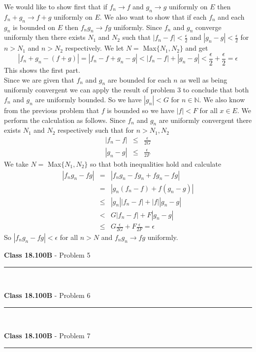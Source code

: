 \documentclass[11pt,reqno]{article}
\begin{document}
We would like to show first that if $f_n \to f$ and $g_n \to g$ uniformly on $E$ then $f_n + g_n \to f + g$ uniformly on $E$. We also want to show that if each $f_n$ and each $g_n$ is bounded on $E$ then $f_n g_n \to fg$ uniformly.
Since $f_n$ and $g_n$ converge uniformly then there exists $N_1$ and $N_2$ such that $|f_n - f | < \frac{\epsilon}{2}$ and $|g_n - g | < \frac{\epsilon}{2}$ for $n > N_1$ and $n > N_2$ respectively. We let $N = $ Max$\{N_1,N_2\}$ and get 
\[ |f_n + g_n - (f+g)| = |f_n - f + g_n - g| < |f_n - f| + |g_n - g| < \frac{\epsilon}{2} + \frac{\epsilon}{2} = \epsilon \]
This shows the first part.\\
\indent Since we are given that $f_n$ and $g_n$ are bounded for each $n$ as well as being uniformly convergent we can apply the result of problem 3 to conclude that both $f_n$ and $g_n$ are uniformly bounded. So we have $|g_n| < G$ for $n \in \mathbb{N}$. We also know from the previous problem that $f$ is bounded so we have $|f| < F$ for all $x \in E$. We perform the calculation as follows. Since $f_n$ and $g_n$ are uniformly convergent there exists $N_1$ and $N_2$ respectively such that for $n > N_1,N_2$
\begin{eqnarray*}
|f_n - f| &\le& \frac{\epsilon}{2G} \\
|g_n - g| &\le& \frac{\epsilon}{2F}
\end{eqnarray*}
We take $N = $ Max$\{ N_1, N_2\}$ so that both inequalities hold and calculate
\begin{eqnarray*}
 |f_n g_n - f g| &=& |f_n g_n - f g_n + f g_n - f g| \\
 		       &=& |g_n(f_n - f) + f (g_n - g)| \\ 
		       &\le&  |g_n||f_n - f| + |f||g_n-g| \\
		       &<& G|f_n - f| + F |g_n-g| \\
		       &\le& G \frac{\epsilon}{2G} + F \frac{\epsilon}{2F} = \epsilon
\end{eqnarray*}
So $ |f_n g_n - f g| < \epsilon $ for all $n > N$ and $f_n g_n \to fg$ uniformly.

\vspace{15pt}
\begin{flushleft} 
\textbf{Class 18.100B} - Problem 5\\
\rule{500pt}{1pt}\\
\end{flushleft} 



\vspace{15pt}
\begin{flushleft} 
\textbf{Class 18.100B} - Problem 6\\
\rule{500pt}{1pt}\\
\end{flushleft} 


\vspace{15pt}
\begin{flushleft} 
\textbf{Class 18.100B} - Problem 7\\
\rule{500pt}{1pt}\\
\end{flushleft} 

\end{document}
